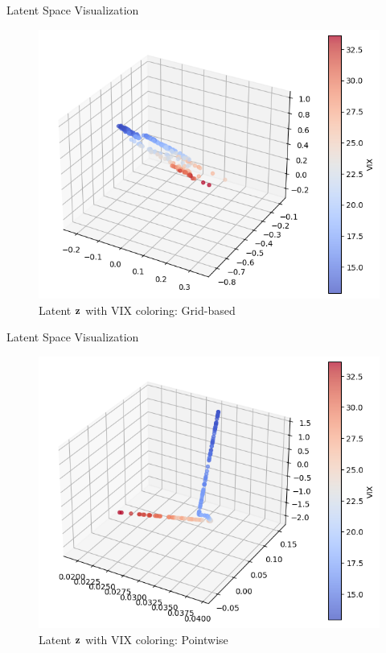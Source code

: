\documentclass{beamer}
\begin{document}
\begin{frame}{Latent Space Visualization}
\begin{figure}
    \centering
    \includegraphics[width=0.8\linewidth]{docs/slides/img/latent_vix_grid.jpg}
    \caption{Latent $\bf{z}$ with VIX coloring: Grid-based}
    \label{fig:enter-label}
\end{figure}
\end{frame}

\begin{frame}{Latent Space Visualization}
\begin{figure}
    \centering
    \includegraphics[width=0.8\linewidth]{docs/slides/img/latent_vix.png}
    \caption{Latent $\bf{z}$ with VIX coloring: Pointwise}
    \label{fig:enter-label}
\end{figure}
\end{frame}
\end{document}
